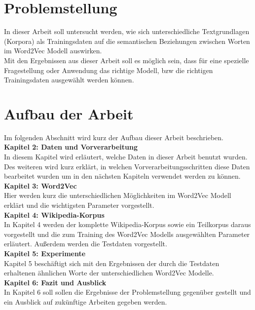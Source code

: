 \documentclass[12pt,a4paper]{report}
\begin{document}
	\section{Problemstellung}
	In dieser Arbeit soll untersucht werden, wie sich unterschiedliche Textgrundlagen (Korpora) als Trainingsdaten auf die semantischen Beziehungen zwischen Worten im Word2Vec Modell auswirken. \\
	Mit den Ergebnissen aus dieser Arbeit soll es möglich sein, dass für eine spezielle Fragestellung oder Anwendung das richtige Modell, bzw die richtigen Trainingsdaten ausgewählt werden können.
	
	
	\newpage
	\section{Aufbau der Arbeit}
	Im folgenden Abschnitt wird kurz der Aufbau dieser Arbeit beschrieben.\\
	
	\textbf{Kapitel 2: Daten und Vorverarbeitung}\\
	In diesem Kapitel wird erläutert, welche Daten in dieser Arbeit benutzt wurden. Des weiteren wird kurz erklärt, in welchen Vorverarbeitungsschritten diese Daten bearbeitet wurden um in den nächsten Kapiteln verwendet werden zu können.\\
	
	\textbf{Kapitel 3: Word2Vec}\\
	Hier werden kurz die unterschiedlichen Möglichkeiten im Word2Vec Modell erklärt und die wichtigsten Parameter vorgestellt.\\
	
	\textbf{Kapitel 4: Wikipedia-Korpus}\\
	In Kapitel 4 werden der komplette Wikipedia-Korpus sowie ein Teilkorpus daraus vorgestellt und die zum Training des Word2Vec Modells ausgewählten Parameter erläutert. Außerdem werden die Testdaten vorgestellt.\\
	
	\textbf{Kapitel 5: Experimente}\\
	Kapitel 5 beschäftigt sich mit den Ergebnissen der durch die Testdaten erhaltenen ähnlichen Worte der unterschiedlichen Word2Vec Modelle.\\
	
	\textbf{Kapitel 6: Fazit und Ausblick}\\
	In Kapitel 6 soll sollen die Ergebnisse der Problemstellung gegenüber gestellt und ein Ausblick auf zukünftige Arbeiten gegeben werden.\\
	
\end{document}
